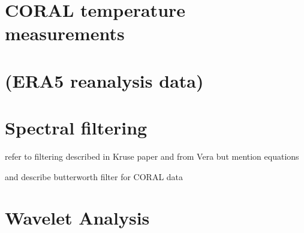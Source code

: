 






\section{CORAL temperature measurements} 


\section{(ERA5 reanalysis data)}



\section{Spectral filtering}

refer to filtering described in Kruse paper and from Vera
but mention equations


and describe butterworth filter for CORAL data

\section{Wavelet Analysis}



